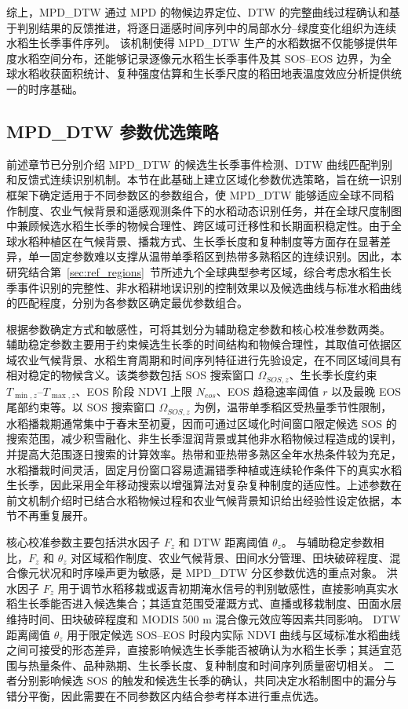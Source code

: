 综上，MPD\_DTW 通过 MPD 的物候边界定位、DTW 的完整曲线过程确认和基于判别结果的反馈推进，将逐日遥感时间序列中的局部水分--绿度变化组织为连续水稻生长季事件序列。
该机制使得 MPD\_DTW 生产的水稻数据不仅能够提供年度水稻空间分布，还能够记录逐像元水稻生长季事件及其 SOS--EOS 边界，为全球水稻收获面积统计、复种强度估算和生长季尺度的稻田地表温度效应分析提供统一的时序基础。

\subsection{MPD\_DTW 参数优选策略}
\label{sec:param_selection}

前述章节已分别介绍 MPD\_DTW 的候选生长季事件检测、DTW 曲线匹配判别和反馈式连续识别机制。本节在此基础上建立区域化参数优选策略，旨在统一识别框架下确定适用于不同参数区的参数组合，使 MPD\_DTW 能够适应全球不同稻作制度、农业气候背景和遥感观测条件下的水稻动态识别任务，并在全球尺度制图中兼顾候选水稻生长季的物候合理性、跨区域可迁移性和长期面积稳定性。由于全球水稻种植区在气候背景、播栽方式、生长季长度和复种制度等方面存在显著差异，单一固定参数难以支撑从温带单季稻区到热带多熟稻区的连续识别。因此，本研究结合第~\ref{sec:ref_regions}~节所述九个全球典型参考区域，综合考虑水稻生长季事件识别的完整性、非水稻耕地误识别的控制效果以及候选曲线与标准水稻曲线的匹配程度，分别为各参数区确定最优参数组合。

根据参数确定方式和敏感性，可将其划分为辅助稳定参数和核心校准参数两类。
辅助稳定参数主要用于约束候选生长季的时间结构和物候合理性，其取值可依据区域农业气候背景、水稻生育周期和时间序列特征进行先验设定，在不同区域间具有相对稳定的物候含义。该类参数包括 SOS 搜索窗口 $\Omega_{SOS,z}$、生长季长度约束 $T_{\min,z}$--$T_{\max,z}$、EOS 阶段 NDVI 上限 $N_{eos}$、EOS 趋稳速率阈值 $r$ 以及最晚 EOS 尾部约束等。以 SOS 搜索窗口 $\Omega_{SOS,z}$ 为例，温带单季稻区受热量季节性限制，水稻播栽期通常集中于春末至初夏，因而可通过区域化时间窗口限定候选 SOS 的搜索范围，减少积雪融化、非生长季湿润背景或其他非水稻物候过程造成的误判，并提高大范围逐日搜索的计算效率。热带和亚热带多熟区全年水热条件较为充足，水稻播栽时间灵活，固定月份窗口容易遗漏错季种植或连续轮作条件下的真实水稻生长季，因此采用全年移动搜索以增强算法对复杂复种制度的适应性。上述参数在前文机制介绍时已结合水稻物候过程和农业气候背景知识给出经验性设定依据，本节不再重复展开。

核心校准参数主要包括洪水因子 $F_z$ 和 DTW 距离阈值 $\theta_z$。
与辅助稳定参数相比，$F_z$ 和 $\theta_z$ 对区域稻作制度、农业气候背景、田间水分管理、田块破碎程度、混合像元状况和时序噪声更为敏感，是 MPD\_DTW 分区参数优选的重点对象。
洪水因子 $F_z$ 用于调节水稻移栽或返青初期淹水信号的判别敏感性，直接影响真实水稻生长季能否进入候选集合；其适宜范围受灌溉方式、直播或移栽制度、田面水层维持时间、田块破碎程度和 MODIS 500 m 混合像元效应等因素共同影响。
DTW 距离阈值 $\theta_z$ 用于限定候选 SOS--EOS 时段内实际 NDVI 曲线与区域标准水稻曲线之间可接受的形态差异，直接影响候选生长季能否被确认为水稻生长季；其适宜范围与热量条件、品种熟期、生长季长度、复种制度和时间序列质量密切相关。
二者分别影响候选 SOS 的触发和候选生长季的确认，共同决定水稻制图中的漏分与错分平衡，因此需要在不同参数区内结合参考样本进行重点优选。

